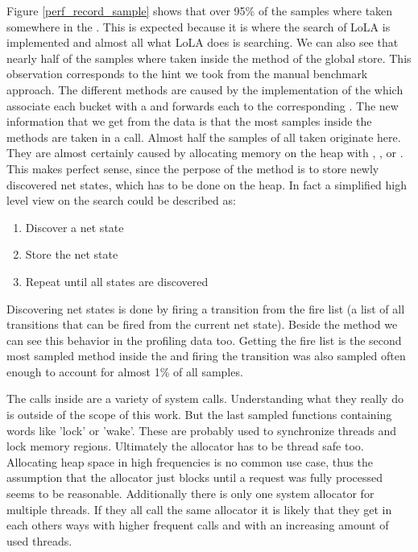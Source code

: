 Figure \ref{perf_record_sample} shows that over 95\% of the samples where taken somewhere in the . This is expected because it is where the search of LoLA is implemented and almost all what LoLA does is searching. We can also see that nearly half of the samples where taken inside the  method of the global store. This observation corresponds to the hint we took from the manual benchmark approach. The different  methods are caused by the implementation of the  which associate each bucket with a  and forwards each  to the corresponding .
The new information that we get from the data is that the most samples inside the  methods are taken in a  call. Almost half the samples of all taken originate here. They are almost certainly caused by allocating memory on the heap with , , or . This makes perfect sense, since the perpose of the  method is to store newly discovered net states, which has to be done on the heap. In fact a simplified high level view on the search could be described as:
\begin{enumerate}
    \item Discover a net state
    \item Store the net state
    \item Repeat until all states are discovered
\end{enumerate}
Discovering net states is done by firing a transition from the fire list (a list of all transitions that can be fired from the current net state). Beside the  method we can see this behavior in the profiling data too. Getting the fire list is the second most sampled method inside the  and firing the transition was also sampled often enough to account for almost 1\% of all samples.

The calls inside  are a variety of system calls. Understanding what they really do is outside of the scope of this work. But the last sampled functions containing words like 'lock' or 'wake'. These are probably used to synchronize threads and lock memory regions. Ultimately the allocator has to be thread safe too. Allocating heap space in high frequencies is no common use case, thus the assumption that the allocator just blocks until a request was fully processed seems to be reasonable. Additionally there is only one system allocator for multiple threads. If they all call the same allocator it is likely that they get in each others ways with higher frequent calls and with an increasing amount of used threads.

